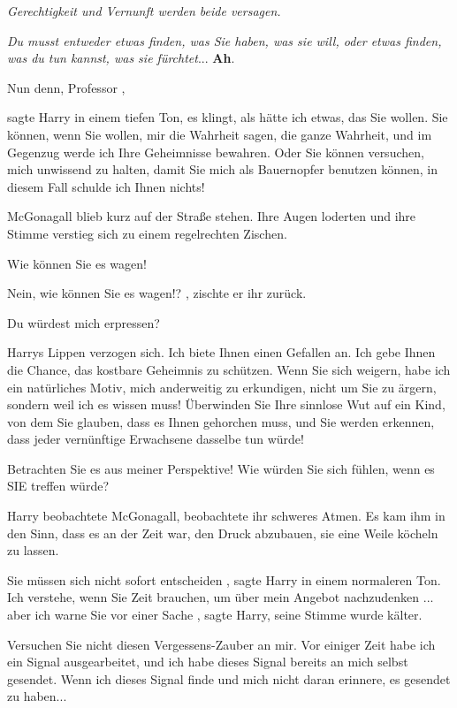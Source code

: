 \emph{Gerechtigkeit und Vernunft werden beide versagen. }

\emph{Du musst entweder etwas finden, was Sie haben, was sie will, oder etwas
finden, was du tun kannst, was sie fürchtet}... \textbf{Ah}.

\glqq Nun denn, Professor\grqq{} ,

sagte Harry in einem tiefen Ton, \glqq es klingt, als hätte ich etwas, das Sie
wollen. Sie können, wenn Sie wollen, mir die Wahrheit sagen, die ganze
Wahrheit, und im Gegenzug werde ich Ihre Geheimnisse bewahren. Oder Sie
können versuchen, mich unwissend zu halten, damit Sie mich als Bauernopfer
benutzen können, in diesem Fall schulde ich Ihnen nichts!\grqq{}

McGonagall blieb kurz auf der Straße stehen. Ihre Augen loderten und ihre Stimme
verstieg sich zu einem regelrechten Zischen.

\glqq Wie können Sie es wagen!\grqq{}

\glqq Nein, wie können Sie es wagen!?\grqq{} , zischte er ihr zurück.

\glqq Du würdest mich erpressen?\grqq{}

Harrys Lippen verzogen sich. \glqq Ich biete Ihnen einen Gefallen an. Ich gebe Ihnen
die Chance, das kostbare Geheimnis zu schützen. Wenn Sie sich weigern, habe
ich ein natürliches Motiv, mich anderweitig zu erkundigen, nicht um Sie zu
ärgern, sondern weil ich es wissen muss! Überwinden Sie Ihre sinnlose Wut
auf ein Kind, von dem Sie glauben, dass es Ihnen gehorchen muss, und Sie
werden erkennen, dass jeder vernünftige Erwachsene dasselbe tun würde!

Betrachten Sie es aus meiner Perspektive! Wie würden Sie sich fühlen, wenn es
SIE treffen würde?\grqq{}

Harry beobachtete McGonagall, beobachtete ihr schweres Atmen. Es kam ihm in den
Sinn, dass es an der Zeit war, den Druck abzubauen, sie eine Weile köcheln
zu lassen.

\glqq Sie müssen sich nicht sofort entscheiden\grqq{} , sagte Harry in einem
normaleren Ton. \glqq Ich verstehe, wenn Sie Zeit brauchen, um über mein Angebot
nachzudenken ... aber ich warne Sie vor einer Sache\grqq{} , sagte Harry,
seine Stimme wurde kälter.

\glqq Versuchen Sie nicht diesen Vergessens-Zauber an mir. Vor einiger Zeit habe
ich ein Signal ausgearbeitet, und ich habe dieses Signal bereits an mich
selbst gesendet. Wenn ich dieses Signal finde und mich nicht daran erinnere,
es gesendet zu haben...\grqq{}

